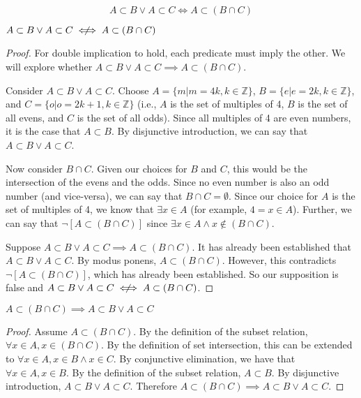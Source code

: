 \documentclass[main.tex]{subfiles}
\begin{document}
\subproblem{}\label{2d}
\[A \subset B \lor A \subset C \iff A \subset (B \cap C)\]
\begin{thm}
	\(A \subset B \lor A \subset C \centernot\iff A \subset (B \cap C)\)
\end{thm}
\begin{proof}
	For double implication to hold, each predicate must imply the other. We
	will explore whether
	\(A \subset B \lor A \subset C \implies A \subset (B \cap C)\).

	Consider \(A \subset B \lor A \subset C\). Choose
	\(A = \{m | m = 4k, k \in \mathbb{Z}\}\),
	\(B = \{e | e = 2k, k \in \mathbb{Z}\}\),
	and \(C = \{o | o = 2k + 1, k \in \mathbb{Z}\}\) (i.e., \(A\) is the set
	of multiples of	4, \(B\) is the set of all evens, and \(C\) is the set
	of all odds). Since all multiples of 4 are even numbers, it is the case
	that \(A \subset B\). By disjunctive introduction, we can say that
	\(A \subset B \lor A \subset C\).

	Now consider \(B \cap C\). Given our choices for \(B\) and \(C\), this
	would be the intersection of the evens and the odds. Since no even
	number is also an odd number (and vice-versa), we can say that
	\(B \cap C = \emptyset\). Since our choice for \(A\) is the set of
	multiples of 4, we know that \(\exists x \in A\) (for example,
	\(4 = x \in A\)). Further, we can say that
	\(\neg [A \subset (B \cap C)]\) since
	\(\exists x \in A \land x \notin (B \cap C)\).

	Suppose \(A \subset B \lor A \subset C \implies A \subset (B \cap C)\).
	It has already been established that \(A \subset B \lor A \subset C\).
	By modus ponens, \(A \subset (B \cap C)\). However, this contradicts
	\(\neg [A \subset (B \cap C)]\), which has already been established. So
	our supposition is false and
	\(A \subset B \lor A \subset C \centernot\iff A \subset (B \cap C)\).
\end{proof}

\begin{thm}
	\(A \subset (B \cap C) \implies A \subset B \lor A \subset C\)
\end{thm}
\begin{proof}
	Assume \(A \subset (B \cap C)\). By the definition of the subset
	relation, \(\forall x \in A, x \in (B \cap C)\). By the definition of
	set intersection, this can be extended to
	\(\forall x \in A, x \in B \land x \in C\).  By conjunctive elimination,
	we have that \(\forall x \in A, x \in B\). By the definition of the
	subset relation, \(A \subset B\). By disjunctive introduction,
	\(A \subset B \lor A \subset C\). Therefore
	\(A \subset (B \cap C) \implies A \subset B \lor A \subset C\).
\end{proof}
\end{document}
